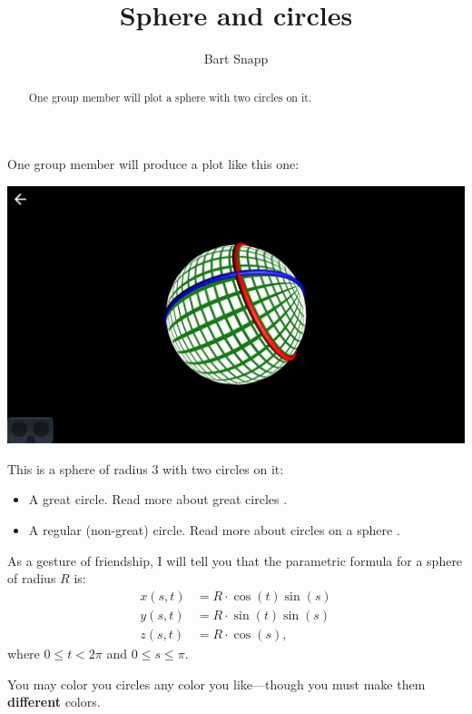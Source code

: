 \documentclass{ximera}
\author{Bart Snapp}
\title{Sphere and circles}
\begin{document}
\begin{abstract}
  One group member will plot a sphere with two circles on it.
\end{abstract}
\maketitle

One group member will produce a plot like this one:
\begin{image}
  \includegraphics{sphereAndCircles.png}
\end{image}

This is a sphere of radius $3$ with two circles on it:
\begin{itemize}
\item A great circle. Read more about great circles .
\item A regular (non-great) circle. Read more about circles on a sphere .
\end{itemize}

As a gesture of friendship, I will tell you that the parametric
formula for a sphere of radius $R$ is:
\begin{align*}
  x(s,t) &= R\cdot \cos(t)\sin(s)\\
  y(s,t) &= R\cdot \sin(t)\sin(s)\\
  z(s,t) &= R\cdot \cos(s),
\end{align*}
where $0\le t< 2\pi$ and $0\le s \le \pi$.

You may color you circles any color you like---though you must make
them \textbf{different} colors.
\end{document}
